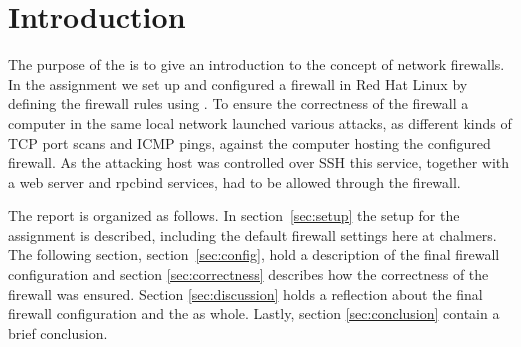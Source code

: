 \section{Introduction} 
\label{sec:intro}

The purpose of the \lab is to give an introduction to the concept of network firewalls. In the assignment we set up and configured a firewall in Red Hat Linux by defining the firewall rules using . To ensure the correctness of the firewall a computer in the same local network launched various attacks, as different kinds of TCP port scans and ICMP pings, against the computer hosting the configured firewall. As the attacking host was controlled over SSH this service, together with a web server and rpcbind services, had to be allowed through the firewall. 

The report is organized as follows. In section~\ref{sec:setup} the setup for the assignment is described, including the default firewall settings here at chalmers. The following section, section~\ref{sec:config}, hold a description of the final firewall configuration and section \ref{sec:correctness} describes how the correctness of the firewall was ensured. Section \ref{sec:discussion} holds a reflection about the final firewall configuration and the \lab as whole. Lastly, section \ref{sec:conclusion} contain a brief conclusion.